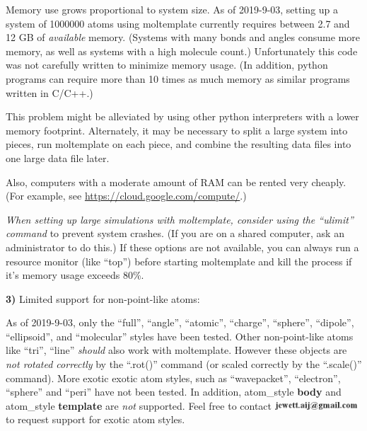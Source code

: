 \documentclass[11pt]{article}
\begin{document}
Memory use grows proportional to system size.
As of 2019-9-03, setting up a system of 1000000 atoms using moltemplate 
currently requires between 2.7 and 12 GB of \textit{available} memory. 
(Systems with many bonds and angles consume more memory, 
 as well as systems with a high molecule count.)
Unfortunately this code was not carefully written to minimize memory usage. 
(In addition, python programs can require more than 10 
times as much memory as similar programs written in C/C++.)

This problem might be alleviated by using other 
python interpreters with a lower memory footprint.
Alternately, it may be necessary to split a large system into pieces, 
run moltemplate on each piece, and combine the resulting data files 
into one large data file later.

Also, computers with a moderate amount of RAM can be rented very cheaply.
(For example, see \url{https://cloud.google.com/compute/}.)

\textit{When setting up large simulations with moltemplate,
consider using the \mbox{``ulimit''} command}
to prevent system crashes.
(If you are on a shared computer, ask an administrator to do this.)
If these options are not available,
you can always run a resource monitor (like ``top'') before 
starting moltemplate and kill the process if it's memory usage exceeds 80\%.


\textbf{3)} Limited support for non-point-like atoms:

As of 2019-9-03, only the ``full'', ``angle'', ``atomic'', ``charge'',
``sphere'', ``dipole'', ``ellipsoid'', and ``molecular'' styles
have been tested.  
Other non-point-like atoms like ``tri'', ``line'' 
\textit{should} also work with moltemplate. 
However these objects
are \textit{not rotated correctly} 
by the ``.rot()'' command
(or scaled correctly by the ``.scale()'' command).
More exotic exotic atom styles, such as 
``wavepacket'', ``electron'', ``sphere'' and ``peri''
have not been tested.
In addition, atom\_style \textbf{body} and 
atom\_style \textbf{template} are \textit{not} 
supported.
Feel free to contact \includegraphics[height=0.3cm]{author_email.png}
to request support for exotic atom styles.
\end{document}
